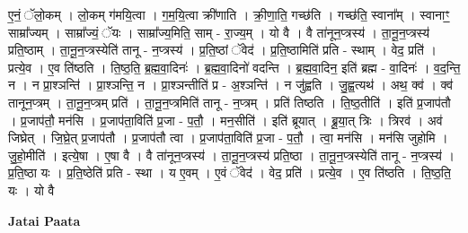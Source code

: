 \documentclass[17pt]{extarticle}
\begin{document}
ए॒नं॒ ॅलो॒कम् । लो॒कम् ग॑मयि॒त्वा । ग॒म॒यि॒त्वा क्री॑णाति । क्री॒णा॒ति॒ गच्छ॑ति । गच्छ॑ति॒ स्वाना᳚म् । स्वानाꣳ॒॒ साम्रा᳚ज्यम् । साम्रा᳚ज्यं॒ ॅयः । साम्रा᳚ज्य॒मिति॒ साम् - रा॒ज्य॒म् । यो वै । वै ता॑नून॒प्त्रस्य॑ । ता॒नू॒न॒प्त्रस्य॑ प्रति॒ष्ठाम् । ता॒नू॒न॒प्त्रस्येति॑ तानू - न॒प्त्रस्य॑ । प्र॒ति॒ष्ठां ॅवेद॑ । प्र॒ति॒ष्ठामिति॑ प्रति - स्थाम् । वेद॒ प्रति॑ । प्रत्ये॒व । ए॒व ति॑ष्ठति । ति॒ष्ठ॒ति॒ ब्र॒ह्म॒वा॒दिनः॑ । ब्र॒ह्म॒वा॒दिनो॑ वदन्ति । ब्र॒ह्म॒वा॒दिन॒ इति॑ ब्रह्म - वा॒दिनः॑ । व॒द॒न्ति॒ न । न प्रा॒श्ञन्ति॑ । प्रा॒श्ञन्ति॒ न । प्रा॒श्ञन्तीति॑ प्र - अ॒श्ञन्ति॑ । न जु॑ह्वति । जु॒ह्व॒त्यथ॑ । अथ॒ क्व॑ । क्व॑ तानून॒प्त्रम् । ता॒नू॒न॒प्त्रम् प्रति॑ । ता॒नू॒न॒प्त्रमिति॑ तानू - न॒प्त्रम् । प्रति॑ तिष्ठति । ति॒ष्ठ॒तीति॑ । इति॑ प्र॒जाप॑तौ । प्र॒जाप॑तौ॒ मन॑सि । प्र॒जाप॑ता॒विति॑ प्र॒जा - प॒तौ॒ । मन॒सीति॑ । इति॑ ब्रूयात् । ब्रू॒या॒त् त्रिः । त्रिरव॑ । अव॑ जिघ्रेत् । जि॒घ्रे॒त् प्र॒जाप॑तौ । प्र॒जाप॑तौ त्वा । प्र॒जाप॑ता॒विति॑ प्र॒जा - प॒तौ॒ । त्वा॒ मन॑सि । मन॑सि जुहोमि । जु॒हो॒मीति॑ । इत्ये॒षा । ए॒षा वै । वै ता॑नून॒प्त्रस्य॑ । ता॒नू॒न॒प्त्रस्य॑ प्रति॒ष्ठा । ता॒नू॒न॒प्त्रस्येति॑ तानू - न॒प्त्रस्य॑ । प्र॒ति॒ष्ठा यः । प्र॒ति॒ष्ठेति॑ प्रति - स्था । य ए॒वम् । ए॒वं ॅवेद॑ । वेद॒ प्रति॑ । प्रत्ये॒व । ए॒व ति॑ष्ठति । ति॒ष्ठ॒ति॒ यः । यो वै \newline

\textbf{Jatai Paata} \newline
\end{document}

